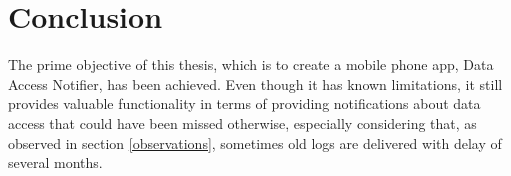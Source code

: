 \section{Conclusion} \label{Conclusion}
The prime objective of this thesis, which is to create a mobile phone app, Data Access Notifier, has been achieved. Even though it has known limitations, it still provides valuable functionality in terms of providing notifications about data access that could have been missed otherwise, especially considering that, as observed in section \ref{observations}, sometimes old logs are delivered with delay of several months.
